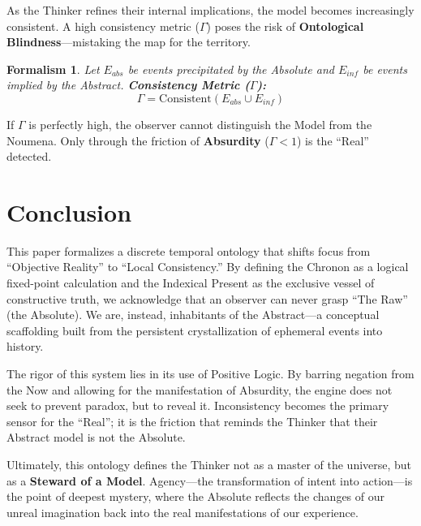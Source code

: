 \documentclass[12pt, a4paper]{article}
\newtheorem{formalism}{Formalism}
\begin{document}
As the Thinker refines their internal implications, the model becomes increasingly consistent. A high consistency metric ($\Gamma$) poses the risk of \textbf{Ontological Blindness}—mistaking the map for the territory.

\begin{formalism}
Let $E_{abs}$ be events precipitated by the Absolute and $E_{inf}$ be events implied by the Abstract.
\textbf{Consistency Metric ($\Gamma$):}
$$\Gamma = \text{Consistent}(E_{abs} \cup E_{inf})$$
\end{formalism}

If $\Gamma$ is perfectly high, the observer cannot distinguish the Model from the Noumena. Only through the friction of \textbf{Absurdity} ($\Gamma < 1$) is the ``Real'' detected.

\section{Conclusion}

This paper formalizes a discrete temporal ontology that shifts focus from ``Objective Reality'' to ``Local Consistency.'' By defining the Chronon as a logical fixed-point calculation and the Indexical Present as the exclusive vessel of constructive truth, we acknowledge that an observer can never grasp ``The Raw'' (the Absolute). We are, instead, inhabitants of the Abstract—a conceptual scaffolding built from the persistent crystallization of ephemeral events into history.

The rigor of this system lies in its use of Positive Logic. By barring negation from the Now and allowing for the manifestation of Absurdity, the engine does not seek to prevent paradox, but to reveal it. Inconsistency becomes the primary sensor for the ``Real''; it is the friction that reminds the Thinker that their Abstract model is not the Absolute.

Ultimately, this ontology defines the Thinker not as a master of the universe, but as a \textbf{Steward of a Model}. Agency—the transformation of intent into action—is the point of deepest mystery, where the Absolute reflects the changes of our unreal imagination back into the real manifestations of our experience.
\end{document}
